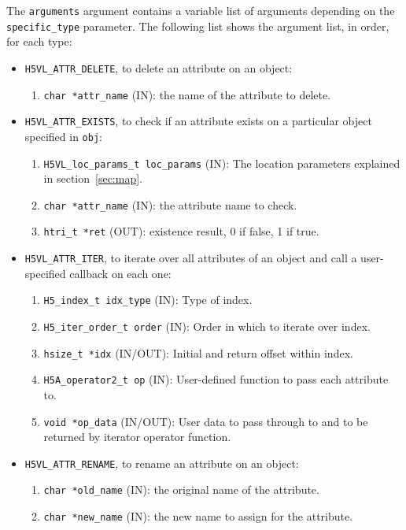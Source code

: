 The \texttt{arguments} argument contains a variable list of arguments
depending on the \texttt{specific\_type} parameter. The following list shows
the argument list, in order, for each type:

\begin{itemize}
\item \texttt{H5VL\_ATTR\_DELETE}, to delete an attribute on an object:
  \begin{enumerate}
  \item \texttt{char *attr\_name} (IN): the name of the attribute to delete.
  \end{enumerate}

\item \texttt{H5VL\_ATTR\_EXISTS}, to check if an attribute exists on a
  particular object specified in \texttt{obj}:
  \begin{enumerate}
  \item \texttt{H5VL\_loc\_params\_t loc\_params} (IN): The location parameters
    explained in section~\ref{sec:map}.
  \item \texttt{char *attr\_name} (IN): the attribute name to check.
  \item \texttt{htri\_t *ret} (OUT): existence result, 0 if false, 1 if true.
  \end{enumerate}

\item \texttt{H5VL\_ATTR\_ITER}, to iterate over all attributes of an object and call a user-specified callback on each one:
  \begin{enumerate}
  \item \texttt{H5\_index\_t idx\_type} (IN): Type of index.\\
  \item \texttt{H5\_iter\_order\_t order} (IN): Order in which to iterate over index.\\
  \item \texttt{hsize\_t *idx} (IN/OUT): Initial and return offset within index.\\
  \item \texttt{H5A\_operator2\_t op} (IN): User-defined function to pass each attribute to. \\
  \item \texttt{void *op\_data} (IN/OUT): User data to pass through to and to be returned by iterator operator function. \\
  \end{enumerate}

\item \texttt{H5VL\_ATTR\_RENAME}, to rename an attribute on an object:
  \begin{enumerate}
  \item \texttt{char *old\_name} (IN): the original name of the attribute.
  \item \texttt{char *new\_name} (IN): the new name to assign for the attribute.
  \end{enumerate}

\end{itemize}


